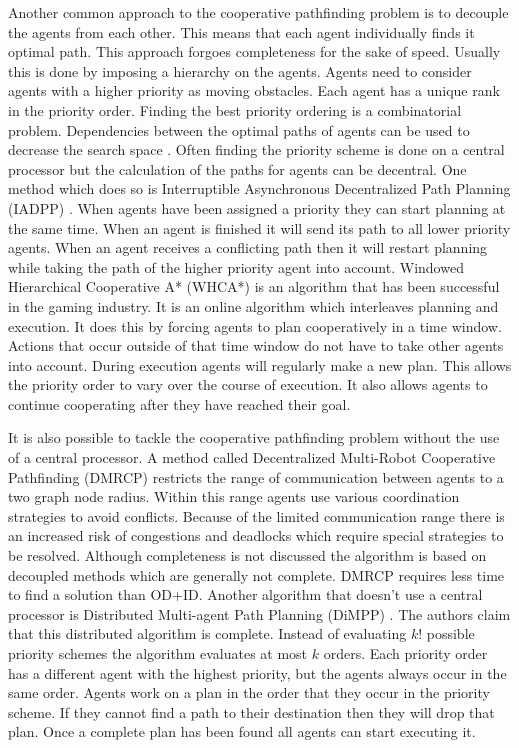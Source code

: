 Another common approach to the cooperative pathfinding problem is to decouple 
the agents from each other. This means that each agent individually finds it 
optimal path. This approach forgoes completeness for the sake of speed. 
Usually this is done by imposing a hierarchy on the agents. Agents need to 
consider agents with a higher priority as moving obstacles. Each agent has a 
unique rank in the priority order. Finding the best priority ordering is a 
combinatorial problem. Dependencies between the optimal paths of agents can be
used to decrease the search space 
\cite{bennewitz2002}. Often finding the priority scheme is done on a central 
processor but the calculation of the paths for agents can be decentral. One 
method which does so is Interruptible Asynchronous Decentralized Path Planning 
(IADPP) \cite{cap2012}. When agents have been assigned a priority they can 
start planning at 
the same time. When an agent is finished it will send its path to all lower 
priority agents. When an agent receives a conflicting path then it will restart 
planning while taking the path of the higher priority 
agent into account. Windowed Hierarchical Cooperative A* (WHCA*) 
\cite{silver2005} is an algorithm that has been successful in the gaming 
industry. It is an online algorithm which interleaves planning and execution. 
It does this by forcing agents to plan cooperatively in a time window. Actions 
that occur outside of that time window do not have to take other agents into 
account. During execution agents will regularly make a new plan. This allows 
the priority order to vary over the course of 
execution. It also allows agents to continue cooperating after they have 
reached their goal.

It is also possible to tackle the cooperative pathfinding problem without the 
use of a central processor. A method called Decentralized Multi-Robot 
Cooperative Pathfinding (DMRCP) \cite{wei2016} restricts the 
range of communication between agents to a two graph node radius. Within this 
range agents use various coordination strategies to avoid conflicts. Because of 
the limited communication range there is an increased risk of congestions and 
deadlocks which require special strategies to be resolved. Although 
completeness is not discussed the algorithm is based on decoupled methods which 
are generally not complete. DMRCP requires less time to find a solution than 
OD+ID. Another algorithm that doesn't use a central processor is Distributed 
Multi-agent Path Planning (DiMPP) \cite{chouhan2017}. The authors claim that 
this distributed algorithm is complete. Instead of evaluating 
$k!$ possible priority schemes the algorithm evaluates at most $k$ orders. Each 
priority order has a different agent with the highest priority, but the agents 
always occur in the same order. Agents work on a plan in the order that they 
occur in the priority scheme. If they cannot find a path to their destination 
then they will drop that plan. Once a complete plan has been found all agents 
can start executing it.

